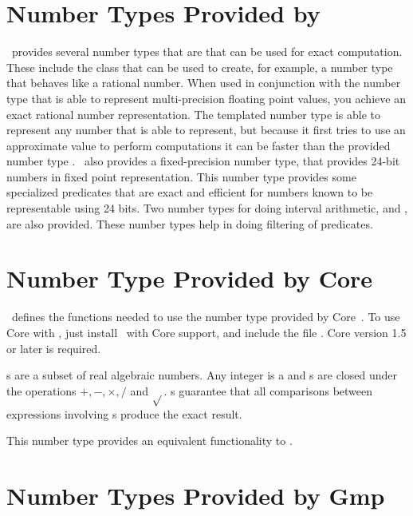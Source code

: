\section{Number Types Provided by \cgal}

\cgal\ provides several number types that are that can be used for 
exact computation.  These include the  class that can
be used to create, for example, a number type that behaves like a rational
number.  When used in conjunction with the number type  that
is able to represent multi-precision floating point values, you achieve
an exact rational number representation.  The templated number type
 is able to represent any number that  is able
to represent, but because it first tries to use an approximate value to
perform computations it can be faster than the provided number type .
\cgal\ also provides a fixed-precision number type,
 that provides 24-bit numbers in fixed point
representation.  This number type provides some specialized predicates
that are exact and efficient for numbers known to be representable using
24 bits.
Two number types for doing interval arithmetic,  and
, are also provided.  These number types
help in doing filtering of predicates.

\section{Number Type Provided by {\sc Core}}
\label{CORE}

\cgal\ defines the functions needed to use the number type 
provided by {\sc Core}~\cite{klpy-clp-99}.  To use {\sc Core} with \cgal, just
install \cgal\ with {\sc Core} support, and include the file
.  {\sc Core} version 1.5 or later is required.

s are a subset of real algebraic numbers.  Any integer is a
 and s are closed under the operations
$+,-,\times,/$ and $\sqrt{}$.  s guarantee that all
comparisons between expressions involving s produce the exact
result.

This number type provides an equivalent functionality to .


\section{Number Types Provided by {\sc Gmp}}

